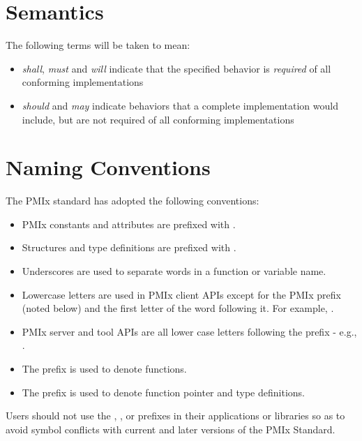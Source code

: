 \section{Semantics}

The following terms will be taken to mean:

\begin{itemize}
\item \emph{shall}, \emph{must} and \emph{will} indicate that the specified behavior is \emph{required} of all conforming implementations
\item \emph{should} and \emph{may} indicate behaviors that a complete implementation would include, but are not required of all conforming implementations
\end{itemize}

\section{Naming Conventions}

The \ac{PMIx} standard has adopted the following conventions:

\begin{itemize}
\item \ac{PMIx} constants and attributes are prefixed with \textbf{}.
\item Structures and type definitions are prefixed with .
\item Underscores are used to separate words in a function or variable name.
\item Lowercase letters are used in \ac{PMIx} client \acp{API} except for the \ac{PMIx} prefix (noted below) and the first letter of the word following it.
For example, .
\item \ac{PMIx} server and tool \acp{API} are all lower case letters following the prefix - e.g., .
\item The  prefix is used to denote functions.
\item The  prefix is used to denote function pointer and type definitions.
\end{itemize}

Users should not use the \textbf{}, \textbf{}, or \textbf{} prefixes in their applications or libraries so as to avoid symbol conflicts with current and later versions of the \ac{PMIx} Standard.

